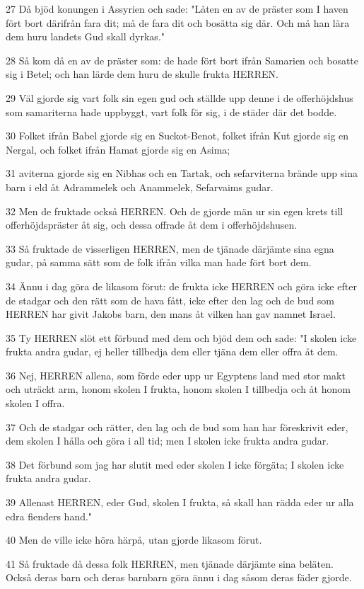 \par 27 Då bjöd konungen i Assyrien och sade: "Låten en av de präster som I haven fört bort därifrån fara dit; må de fara dit och bosätta sig där. Och må han lära dem huru landets Gud skall dyrkas."
\par 28 Så kom då en av de präster som: de hade fört bort ifrån Samarien och bosatte sig i Betel; och han lärde dem huru de skulle frukta HERREN.
\par 29 Väl gjorde sig vart folk sin egen gud och ställde upp denne i de offerhöjdshus som samariterna hade uppbyggt, vart folk för sig, i de städer där det bodde.
\par 30 Folket ifrån Babel gjorde sig en Suckot-Benot, folket ifrån Kut gjorde sig en Nergal, och folket ifrån Hamat gjorde sig en Asima;
\par 31 aviterna gjorde sig en Nibhas och en Tartak, och sefarviterna brände upp sina barn i eld åt Adrammelek och Anammelek, Sefarvaims gudar.
\par 32 Men de fruktade också HERREN. Och de gjorde män ur sin egen krets till offerhöjdspräster åt sig, och dessa offrade åt dem i offerhöjdshusen.
\par 33 Så fruktade de visserligen HERREN, men de tjänade därjämte sina egna gudar, på samma sätt som de folk ifrån vilka man hade fört bort dem.
\par 34 Ännu i dag göra de likasom förut: de frukta icke HERREN och göra icke efter de stadgar och den rätt som de hava fått, icke efter den lag och de bud som HERREN har givit Jakobs barn, den mans åt vilken han gav namnet Israel.
\par 35 Ty HERREN slöt ett förbund med dem och bjöd dem och sade: "I skolen icke frukta andra gudar, ej heller tillbedja dem eller tjäna dem eller offra åt dem.
\par 36 Nej, HERREN allena, som förde eder upp ur Egyptens land med stor makt och uträckt arm, honom skolen I frukta, honom skolen I tillbedja och åt honom skolen I offra.
\par 37 Och de stadgar och rätter, den lag och de bud som han har föreskrivit eder, dem skolen I hålla och göra i all tid; men I skolen icke frukta andra gudar.
\par 38 Det förbund som jag har slutit med eder skolen I icke förgäta; I skolen icke frukta andra gudar.
\par 39 Allenast HERREN, eder Gud, skolen I frukta, så skall han rädda eder ur alla edra fienders hand."
\par 40 Men de ville icke höra härpå, utan gjorde likasom förut.
\par 41 Så fruktade då dessa folk HERREN, men tjänade därjämte sina beläten. Också deras barn och deras barnbarn göra ännu i dag såsom deras fäder gjorde.

